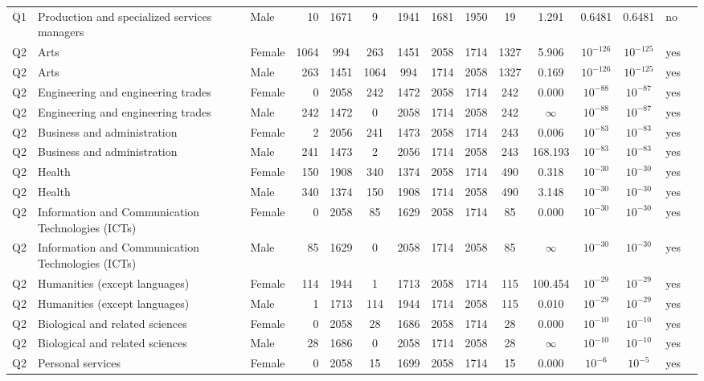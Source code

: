 \begin{longtable}{lllrcccccccccll}
Q1 & Production and specialized services managers & Male & 10 & 1671 & 9 & 1941 & 1681 & 1950 & 19 & 1.291 & 0.6481 & 0.6481 & no \\
Q2 & Arts & Female & 1064 & 994 & 263 & 1451 & 2058 & 1714 & 1327 & 5.906 & $10^{-126}$ & $10^{-125}$ & yes \\
Q2 & Arts & Male & 263 & 1451 & 1064 & 994 & 1714 & 2058 & 1327 & 0.169 & $10^{-126}$ & $10^{-125}$ & yes \\
Q2 & Engineering and engineering trades & Female & 0 & 2058 & 242 & 1472 & 2058 & 1714 & 242 & 0.000 & $10^{-88}$ & $10^{-87}$ & yes \\
Q2 & Engineering and engineering trades & Male & 242 & 1472 & 0 & 2058 & 1714 & 2058 & 242 & $\infty$ & $10^{-88}$ & $10^{-87}$ & yes \\
Q2 & Business and administration & Female & 2 & 2056 & 241 & 1473 & 2058 & 1714 & 243 & 0.006 & $10^{-83}$ & $10^{-83}$ & yes \\
Q2 & Business and administration & Male & 241 & 1473 & 2 & 2056 & 1714 & 2058 & 243 & 168.193 & $10^{-83}$ & $10^{-83}$ & yes \\
Q2 & Health & Female & 150 & 1908 & 340 & 1374 & 2058 & 1714 & 490 & 0.318 & $10^{-30}$ & $10^{-30}$ & yes \\
Q2 & Health & Male & 340 & 1374 & 150 & 1908 & 1714 & 2058 & 490 & 3.148 & $10^{-30}$ & $10^{-30}$ & yes \\
Q2 & Information and Communication Technologies (ICTs) & Female & 0 & 2058 & 85 & 1629 & 2058 & 1714 & 85 & 0.000 & $10^{-30}$ & $10^{-30}$ & yes \\
Q2 & Information and Communication Technologies (ICTs) & Male & 85 & 1629 & 0 & 2058 & 1714 & 2058 & 85 & $\infty$ & $10^{-30}$ & $10^{-30}$ & yes \\
Q2 & Humanities (except languages) & Female & 114 & 1944 & 1 & 1713 & 2058 & 1714 & 115 & 100.454 & $10^{-29}$ & $10^{-29}$ & yes \\
Q2 & Humanities (except languages) & Male & 1 & 1713 & 114 & 1944 & 1714 & 2058 & 115 & 0.010 & $10^{-29}$ & $10^{-29}$ & yes \\
Q2 & Biological and related sciences & Female & 0 & 2058 & 28 & 1686 & 2058 & 1714 & 28 & 0.000 & $10^{-10}$ & $10^{-10}$ & yes \\
Q2 & Biological and related sciences & Male & 28 & 1686 & 0 & 2058 & 1714 & 2058 & 28 & $\infty$ & $10^{-10}$ & $10^{-10}$ & yes \\
Q2 & Personal services & Female & 0 & 2058 & 15 & 1699 & 2058 & 1714 & 15 & 0.000 & $10^{-6}$ & $10^{-5}$ & yes \\

\end{longtable}
